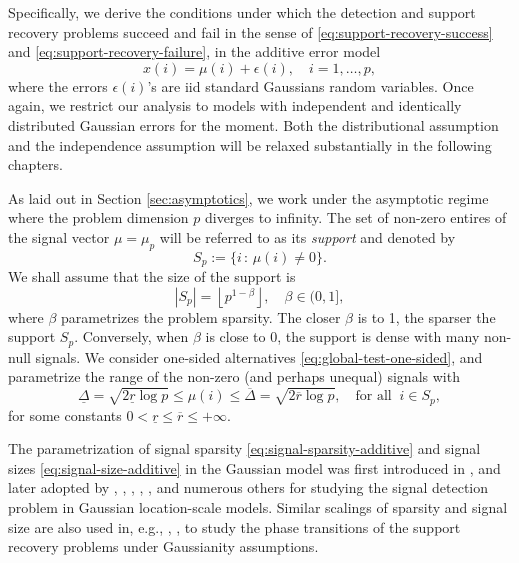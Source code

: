 
Specifically, we derive the conditions under which the detection and support recovery problems succeed and fail in the sense of \eqref{eq:support-recovery-success} and \eqref{eq:support-recovery-failure}, in the additive error model 
\begin{equation} \label{eq:model-additive-Chapter3}
    x(i) = \mu(i) + \epsilon(i), \quad i=1,\ldots,p,
\end{equation}
where the errors $\epsilon(i)$'s are \ac{iid} standard Gaussians random variables.
Once again, we restrict our analysis to models with independent and identically distributed Gaussian errors for the 
moment. Both the distributional assumption and the independence assumption will be relaxed substantially in the following chapters.

As laid out in Section \ref{sec:asymptotics}, we work under the asymptotic regime where the problem dimension 
$p$ diverges to infinity.  The set of non-zero entires of the signal vector $\mu = \mu_p$ will be referred
to as its {\em support} and denoted by 
$$
 S_p:=\{i\, :\, \mu(i)\not = 0\}.
$$
We shall assume that the size of the support is
\begin{equation} \label{eq:signal-sparsity-additive}
    |S_p| = \left\lfloor p^{1-\beta} \right\rfloor, \quad \beta\in(0,1],
\end{equation}
where $\beta$ parametrizes the problem sparsity.
The closer $\beta$ is to 1, the sparser the support $S_p$.  
Conversely, when $\beta$ is close to 0, the support is dense with many non-null signals.
We consider one-sided alternatives \eqref{eq:global-test-one-sided}, and parametrize the range of the non-zero (and perhaps unequal) signals with
\begin{equation} \label{eq:signal-size-additive}
    \underline{\Delta} = \sqrt{2\underline{r}\log{p}}
    \le \mu(i) \le
    \overline{\Delta} = \sqrt{2\overline{r}\log{p}}, \quad \text{for all}\;\;i\in S_p,
\end{equation}
for some constants $0<\underline{r}\le\overline{r}\le+\infty$.

The parametrization of signal sparsity \eqref{eq:signal-sparsity-additive} and signal sizes \eqref{eq:signal-size-additive} in the Gaussian model was first introduced in \citet{ingster1998minimax}, and later adopted by \cite{hall2010innovated}, \cite{cai2011optimal}, \cite{zhong2013tests}, \cite{cai2014optimal}, \cite{arias2017distribution1}, and numerous others for studying the signal detection problem in Gaussian location-scale models.
Similar scalings of sparsity and signal size are also used in, e.g., \cite{ji2012ups}, \cite{jin2014optimality}, \cite{butucea2018variable} to study the phase transitions of the support recovery problems under Gaussianity assumptions.

